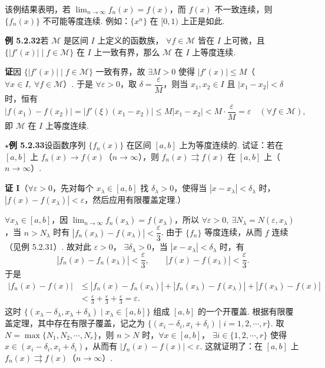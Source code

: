 \documentclass[UTF8, 12pt, fontset=fandol, oneside]{ctexart}
\begin{document}
该例结果表明，若 $\displaystyle\lim_{n\to\infty}f_n(x)=f(x)$，而 $f(x)$ 不一致连续，则
$\{f_n(x)\}$ 不可能等度连续. 例如：$\{x^n\}$ 在 $[0,1)$ 上正是如此.

\noindent\textbf{例 5.2.32}\quad 若 $\mathcal M$ 是区间 $I$ 上定义的函数族，
$\forall f\in\mathcal M$ 皆在 $I$ 上可微，且
$\{|f'(x)|\mid f\in\mathcal M\}$ 在 $I$ 上一致有界，那么 $\mathcal M$ 在 $I$ 上等度连续.

\noindent\textbf{证}\quad 因 $\{|f'(x)|\mid f\in\mathcal M\}$ 一致有界，故
$\exists M>0$ 使得 $|f'(x)|\le M$（$\forall x\in I,\ \forall f\in\mathcal M$）. 于是
$\forall\varepsilon>0$，取 $\delta=\dfrac\varepsilon M$，则当
$x_1,x_2\in I$ 且 $|x_1-x_2|<\delta$ 时，恒有
\[
  |f(x_1)-f(x_2)|=|f'(\xi)(x_1-x_2)|
  \le M|x_1-x_2|<M\cdot\frac\varepsilon M=\varepsilon\quad(\forall f\in\mathcal M),
\]
即 $\mathcal M$ 在 $I$ 上等度连续.

\noindent\textbf{$\star$例 5.2.33}\quad 设函数序列 $\{f_n(x)\}$ 在区间 $[a,b]$ 上为等度连续的. 试证：若在
$[a,b]$ 上 $f_n(x)\to f(x)$（$n\to\infty$），则
$f_n(x)\rightrightarrows f(x)$ 在 $[a,b]$ 上（$n\to\infty$）.

\noindent\textbf{证 I}\quad （$\forall\varepsilon>0$，先对每个 $x_\lambda\in[a,b]$ 找
$\delta_\lambda>0$，使得当 $|x-x_\lambda|<\delta_\lambda$ 时，
$|f(x)-f(x_\lambda)|<\varepsilon$，然后应用有限覆盖定理.）

$\forall x_\lambda\in[a,b]$，因 $\displaystyle\lim_{n\to\infty}f_n(x_\lambda)=f(x_\lambda)$，所以
$\forall\varepsilon>0,\ \exists N_\lambda=N(\varepsilon,x_\lambda)$，当
$n>N_\lambda$ 时有 $|f_n(x_\lambda)-f(x_\lambda)|<\dfrac\varepsilon3$. 由于
$\{f_n\}$ 等度连续，从而 $f$ 连续（见例 5.2.31）. 故对此 $\varepsilon>0$，
$\exists\delta_\lambda>0$，当 $|x-x_\lambda|<\delta_\lambda$ 时，有
\[
  |f_n(x)-f_n(x_\lambda)|<\frac\varepsilon3,\qquad
  |f(x)-f(x_\lambda)|<\frac\varepsilon3.
\]
于是
\[
\begin{aligned}
  |f_n(x)-f(x)|
  &\le |f_n(x)-f_n(x_\lambda)|
    +|f_n(x_\lambda)-f(x_\lambda)|+|f(x_\lambda)-f(x)|\\
  &<\frac\varepsilon3+\frac\varepsilon3+\frac\varepsilon3=\varepsilon.
\end{aligned}
\]
这时 $\{(x_\lambda-\delta_\lambda,x_\lambda+\delta_\lambda)\mid x_\lambda\in[a,b]\}$
组成 $[a,b]$ 的一个开覆盖. 根据有限覆盖定理，其中存在有限子覆盖，记之为
$\{(x_i-\delta_i,x_i+\delta_i)\mid i=1,2,\cdots,r\}$. 取
$N=\max\{N_1,N_2,\cdots,N_r\}$，则 $n>N$ 时，$\forall x\in[a,b]$，
$\exists i\in\{1,2,\cdots,r\}$ 使得 $x\in(x_i-\delta_i,x_i+\delta_i)$，从而有
$|f_n(x)-f(x)|<\varepsilon$. 这就证明了：在 $[a,b]$ 上
$f_n(x)\rightrightarrows f(x)$（$n\to\infty$）.
\end{document}
